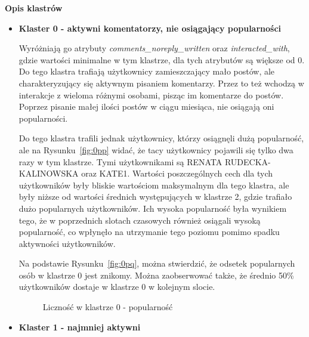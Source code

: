 \documentclass[polish,12pt]{aghthesis}
\begin{document}
\textbf{Opis klastrów}

\begin{itemize}
    \item \textbf{Klaster 0 - aktywni komentatorzy, nie osiągający popularności}
    
    Wyróżniają go atrybuty \textit{comments\_noreply\_written} oraz \textit{interacted\_with}, gdzie wartości minimalne w tym klastrze, dla tych atrybutów są większe od 0. Do tego klastra trafiają użytkownicy zamieszczający mało postów, ale charakteryzujący się aktywnym pisaniem komentarzy. Przez to też wchodzą w interakcje z wieloma różnymi osobami, pisząc im komentarze do postów. Poprzez pisanie małej ilości postów w ciągu miesiąca, nie osiągają oni popularności. 
    

Do tego klastra trafili jednak użytkownicy, którzy osiągnęli dużą popularność, ale na Rysunku~\ref{fig:0pp} widać, że tacy użytkownicy pojawili się tylko dwa razy w tym klastrze. Tymi użytkownikami są RENATA RUDECKA-KALINOWSKA oraz KATE1. Wartości poszczególnych cech dla tych użytkowników były bliskie wartościom maksymalnym dla tego klastra, ale były niższe od wartości średnich występujących w klastrze 2, gdzie trafiało dużo popularnych użytkowników. Ich wysoka popularność była wynikiem tego, że w poprzednich slotach czasowych również osiągali wysoką popularność, co wpłynęło na utrzymanie tego poziomu pomimo spadku aktywności użytkowników. 

Na podstawie Rysunku~\ref{fig:0pq}, można stwierdzić, że odsetek popularnych osób w klastrze 0 jest znikomy. Można zaobserwować także, że średnio 50\% użytkowników dostaje w klastrze 0 w kolejnym slocie.

   \begin{figure}[ht] 
    \centering
    \hfill%
    \caption{Liczność w klastrze 0 - popularność}
    \label{f:0p}
    \end{figure}



\item \textbf{Klaster 1 - najmniej aktywni}


\end{itemize}
\end{document}
